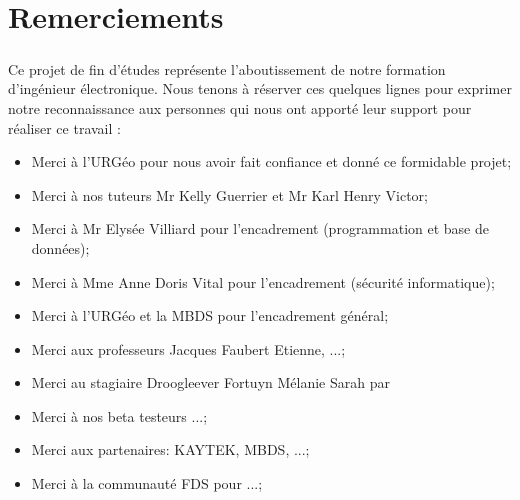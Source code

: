 \chapter*{Remerciements}
\paragraph{}
Ce projet de fin d’études représente l'aboutissement de notre formation d’ingénieur électronique. 
Nous tenons à réserver ces quelques lignes pour exprimer notre
reconnaissance aux personnes qui nous ont apporté leur support pour réaliser ce travail :

\begin{itemize}
    \item Merci à l'URGéo pour nous avoir fait confiance et donné ce formidable projet;\par
    \item Merci à nos tuteurs Mr Kelly Guerrier et Mr Karl Henry Victor;\par
    \item Merci à  Mr Elysée Villiard pour l'encadrement (programmation et base de données);\par
    \item Merci à Mme Anne Doris Vital pour l'encadrement (sécurité informatique);\par
    \item Merci à l'URGéo et la MBDS pour l'encadrement général;\par
    \item Merci aux professeurs Jacques Faubert Etienne, ...;\par
    \item Merci au stagiaire Droogleever Fortuyn Mélanie Sarah par
    \item Merci à nos beta testeurs ...;\par
    \item Merci aux partenaires: KAYTEK, MBDS, ...;\par
    \item Merci à la communauté FDS pour ...;\par
\end{itemize}
